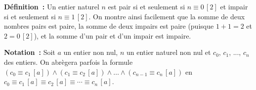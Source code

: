\done

\medskip

\noindent\textbf{Définition :} Un entier naturel $n$ est pair si et seulement si $n \equiv 0 \, [2]$ et impair si et seulement si $n \equiv 1 \, [2]$. 
On montre ainsi facilement que la somme de deux nombres pairs est paire, la somme de deux impairs est paire (puisque $1 + 1 = 2$ et $2 = 0 \, [2]$), et la somme d'un pair et d'un impair est impaire.

\medskip

\noindent\textbf{Notation :} Soit $a$ un entier non nul, $n$ un entier naturel non nul et $c_0$, $c_1$, ..., $c_n$ des entiers.
    On abrègera parfois la formule $(c_0 \equiv c_1 \, [a]) \wedge (c_1 \equiv c_2 \, [a]) \wedge \dots \wedge (c_{n-1} \equiv c_n \, [a])$ en $c_0 \equiv c_1 \, [a] \equiv c_2 \, [a] \equiv \cdots \equiv c_n \, [a]$.
    
    

